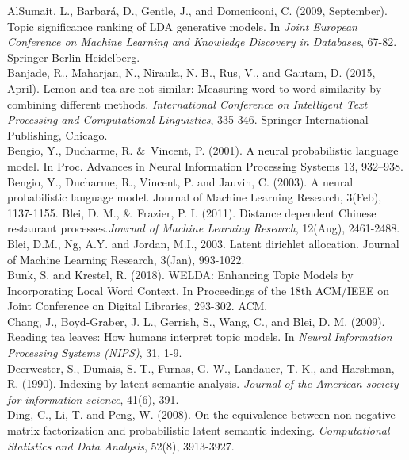 \documentclass[11pt]{article}
\begin{document}
AlSumait, L., Barbará, D., Gentle, J., and Domeniconi, C. (2009, September). Topic significance ranking of LDA generative models. In \emph{Joint European Conference on Machine Learning and Knowledge Discovery in Databases}, 67-82. Springer Berlin Heidelberg. \\
\newline
Banjade, R., Maharjan, N., Niraula, N. B., Rus, V., and Gautam, D. (2015, April). Lemon and tea are not similar: Measuring word-to-word similarity by combining different methods. \emph{International Conference on Intelligent Text Processing and Computational Linguistics}, 335-346. Springer International Publishing, Chicago. \\
\newline
Bengio, Y., Ducharme, R. \&\ Vincent, P. (2001). A neural probabilistic language model. In Proc. Advances in Neural Information Processing Systems 13, 932–938.\\
\newline
Bengio, Y., Ducharme, R., Vincent, P. and Jauvin, C. (2003). A neural probabilistic language model. Journal of Machine Learning Research, 3(Feb), 1137-1155.
Blei, D. M., \&\ Frazier, P. I. (2011). Distance dependent Chinese restaurant processes.\emph{Journal of Machine Learning Research}, 12(Aug), 2461-2488.\\
\newline
Blei, D.M., Ng, A.Y. and Jordan, M.I., 2003. Latent dirichlet allocation. Journal of Machine Learning Research, 3(Jan), 993-1022.\\
\newline
Bunk, S. and Krestel, R. (2018). WELDA: Enhancing Topic Models by Incorporating Local Word Context. In Proceedings of the 18th ACM/IEEE on Joint Conference on Digital Libraries, 293-302. ACM.\\
\newline
Chang, J., Boyd-Graber, J. L., Gerrish, S., Wang, C., and Blei, D. M. (2009). Reading tea leaves: How humans interpret topic models. In \emph{Neural Information Processing Systems (NIPS)}, 31, 1-9. \\
\newline
Deerwester, S., Dumais, S. T., Furnas, G. W., Landauer, T. K., and Harshman, R. (1990). Indexing by latent semantic analysis. \emph{Journal of the American society for information science}, 41(6), 391. \\
\newline
Ding, C., Li, T. and Peng, W. (2008). On the equivalence between non-negative matrix factorization and probabilistic latent semantic indexing. \emph{Computational Statistics and Data Analysis}, 52(8), 3913-3927. \\
\end{document}
